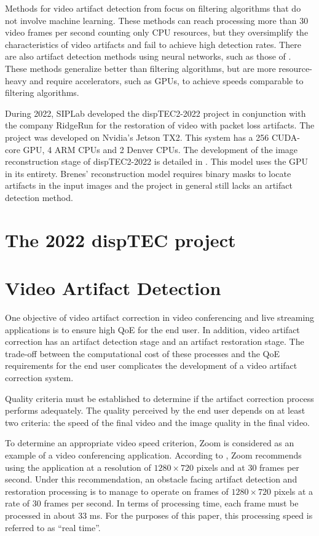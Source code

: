 Methods for video artifact detection from \cite{Vranjes2018, Glavota2018} focus on filtering algorithms that do not involve machine learning. These methods can reach processing more than 30 video frames per second counting only CPU resources, but they oversimplify the characteristics of video artifacts and fail to achieve high detection rates. There are also artifact detection methods using neural networks, such as those of \cite{Goodall2019, Rajasekar2020}. These methods generalize better than filtering algorithms, but are more resource-heavy and require accelerators, such as GPUs, to achieve speeds comparable to filtering algorithms.

During 2022, SIPLab developed the dispTEC2-2022 project in conjunction with the company RidgeRun for the restoration of video with packet loss artifacts. The project was developed on Nvidia's Jetson TX2. This system has a 256 CUDA-core GPU, 4 ARM CPUs and 2 Denver CPUs. The development of the image reconstruction stage of dispTEC2-2022 is detailed in \cite{Brenes2022}. This model uses the GPU in its entirety. Brenes' reconstruction model requires binary masks to locate artifacts in the input images and the project in general still lacks an artifact detection method.

\section{The 2022 dispTEC project}
\label{sec:intro_disptec}

\section{Video Artifact Detection}
\label{sec:intro_problem}

One objective of video artifact correction in video conferencing and live streaming applications is to ensure high QoE for the end user. In addition, video artifact correction has an artifact detection stage and an artifact restoration stage. The trade-off between the computational cost of these processes and the QoE requirements for the end user complicates the development of a video artifact correction system.

Quality criteria must be established to determine if the artifact correction process performs adequately. The quality perceived by the end user depends on at least two criteria: the speed of the final video and the image quality in the final video.

To determine an appropriate video speed criterion, Zoom is considered as an example of a video conferencing application. According to \cite{ZoomSupport}, Zoom recommends using the application at a resolution of $1280 \times 720$ pixels and at 30 frames per second. Under this recommendation, an obstacle facing artifact detection and restoration processing is to manage to operate on frames of $1280 \times 720$ pixels at a rate of 30 frames per second. In terms of processing time, each frame must be processed in about 33 ms. For the purposes of this paper, this processing speed is referred to as ``real time''.

